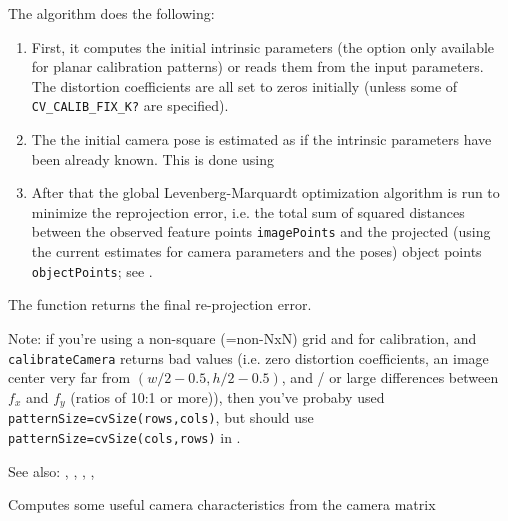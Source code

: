 The algorithm does the following:
\begin{enumerate}
    \item First, it computes the initial intrinsic parameters (the option only available for planar calibration patterns) or reads them from the input parameters. The distortion coefficients are all set to zeros initially (unless some of \texttt{CV\_CALIB\_FIX\_K?} are specified).
    \item The the initial camera pose is estimated as if the intrinsic parameters have been already known. This is done using 
    \item After that the global Levenberg-Marquardt optimization algorithm is run to minimize the reprojection error, i.e. the total sum of squared distances between the observed feature points \texttt{imagePoints} and the projected (using the current estimates for camera parameters and the poses) object points \texttt{objectPoints}; see .
\end{enumerate}

\ifPy
\else
The function returns the final re-projection error.
\fi

Note: if you're using a non-square (=non-NxN) grid and
 for calibration, and \texttt{calibrateCamera} returns
bad values (i.e. zero distortion coefficients, an image center very far from
$(w/2-0.5,h/2-0.5)$, and / or large differences between $f_x$ and $f_y$ (ratios of
10:1 or more)), then you've probaby used \texttt{patternSize=cvSize(rows,cols)},
but should use \texttt{patternSize=cvSize(cols,rows)} in .

See also: , , , , 

\ifCpp

Computes some useful camera characteristics from the camera matrix

